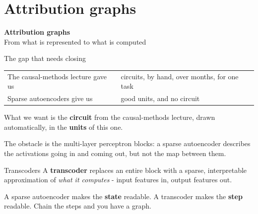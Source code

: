 \documentclass[aspectratio=169]{beamer}
\newcommand{\keybox}[1]{%
  \begin{tcolorbox}[colback=armblue!8, colframe=armblue, boxrule=0.6pt, arc=2pt]
  #1
  \end{tcolorbox}}
\newcommand{\takebox}[1]{%
  \begin{tcolorbox}[colback=paramgreen!8, colframe=paramgreen, boxrule=0.6pt, arc=2pt]
  #1
  \end{tcolorbox}}
\newcommand{\sectiontransition}[2]{%
  \begin{frame}[plain]
    \vfill
    \begin{center}
      {\Huge\bfseries\color{popblue} #1}\\[1.1em]
      {\large #2}
    \end{center}
    \vfill
  \end{frame}}
\begin{document}
\section{Attribution graphs}
\sectiontransition{Attribution graphs}{From what is represented to what is computed}

\begin{frame}{The gap that needs closing}
  \vspace{0.8em}
  \begin{center}
  \small
  \begin{tabular}{@{}ll@{}}
    \toprule
    The causal-methods lecture gave us & circuits, by hand, over months, for one task\\
    Sparse autoencoders give us & good units, and no circuit\\
    \bottomrule
  \end{tabular}
  \end{center}

  \vspace{1.0em}
  \keybox{What we want is the \textbf{circuit} from the causal-methods lecture, drawn
  automatically, in the \textbf{units} of this one.}

  \vspace{1.0em}
  The obstacle is the multi-layer perceptron blocks: a sparse autoencoder describes the
  activations going in and coming out, but not the map between them.
\end{frame}

\begin{frame}{Transcoders}
  \vspace{0.9em}
  A \textbf{transcoder} replaces an entire block with a sparse, interpretable approximation of
  \emph{what it computes} - input features in, output features out.

  \vspace{0.9em}
  \begin{center}
  \end{center}

  \vspace{0.9em}
  \takebox{A sparse autoencoder makes the \textbf{state} readable. A transcoder makes the
  \textbf{step} readable. Chain the steps and you have a graph.}
\end{frame}
\end{document}
